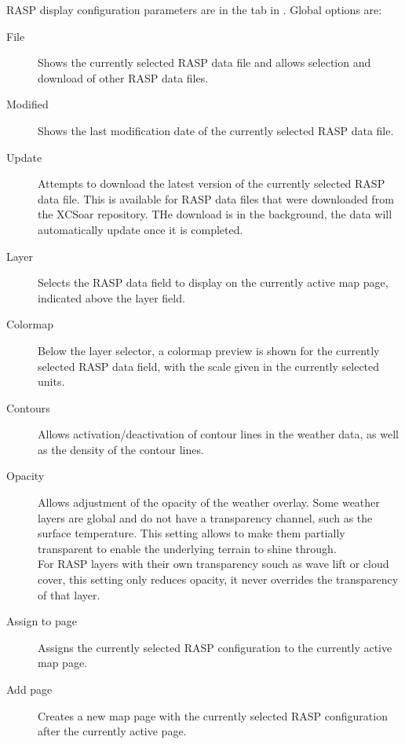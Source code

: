 RASP display configuration parameters are in the  tab in
. Global options are:
\begin{description}
\item[File] Shows the currently selected RASP data file and allows selection 
and download of other RASP data files. 
\item[Modified] Shows the last modification date of the currently selected RASP data file.
\item[Update] Attempts to download the latest version of the currently selected RASP data file.
This is available for RASP data files that were downloaded from the XCSoar repository.
THe download is in the background, the data will automatically update once it is completed.
\item[Layer] Selects the RASP data field to display on the currently active map page, 
indicated above the layer field.
\item[Colormap] Below the layer selector, a colormap preview is shown for the currently
selected RASP data field, with the scale given in the currently selected units.
\item[Contours] Allows activation/deactivation of contour lines in the weather data,
as well as the density of the contour lines.
\item[Opacity] Allows adjustment of the opacity of the weather overlay. Some weather layers
are global and do not have a transparency channel, such as the surface temperature. This
setting allows to make them partially transparent to enable the underlying terrain to
shine through.\\
For RASP layers with their own transparency souch as wave lift or cloud cover, this
setting only reduces opacity, it never overrides the transparency of that layer.
\item[Assign to page] Assigns the currently selected RASP configuration to the currently
active map page.
\item[Add page] Creates a new map page with the currently selected RASP configuration after
the currently active page.
\end{description}

